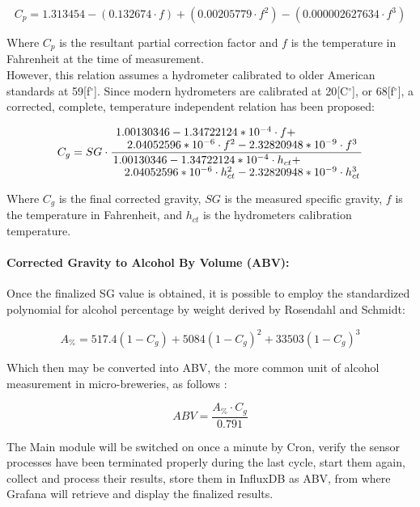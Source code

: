 \documentclass[twoside]{ctuthesis}
\theoremstyle{plain}
\theoremstyle{definition}
\theoremstyle{note}
\begin{document}
\begin{equation}
C_p = 1.313454 - (0.132674\cdot f) + (0.00205779 \cdot f^2) - (0.000002627634 \cdot f^3)
\end{equation}

Where $C_p$ is the resultant partial correction factor and $f$ is the temperature in Fahrenheit at the time of measurement.\\
However, this relation assumes a hydrometer calibrated to older American standards at 59[f$^\circ$]. Since modern hydrometers are calibrated at 20[C$^\circ$], or 68[f$^\circ$], a corrected, complete, temperature independent relation has been proposed:

\begin{equation}
C_g = SG \cdot \frac{\splitfrac{1.00130346 - 1.34722124*10^{-4} \cdot f + }{2.04052596*10^{-6} \cdot f^2 - 2.32820948*10^{-9} \cdot f^3} }{\splitfrac{1.00130346 - 1.34722124*10^{-4} \cdot h_{ct} +}{ 2.04052596*10^{-6} \cdot h_{ct}^2 - 2.32820948*10^{-9} \cdot h_{ct}^3}}
\end{equation}

Where $C_g$ is the final corrected gravity, $SG$ is the measured specific gravity, $f$ is the temperature in Fahrenheit, and $h_{ct}$ is the hydrometers calibration temperature.\\

\paragraph{Corrected Gravity to Alcohol By Volume (ABV):}
Once the finalized SG value is obtained, it is possible to employ the standardized polynomial for alcohol percentage by weight derived by Rosendahl and Schmidt\cite{Brewing_Science}:

\begin{equation}
	A_{\%} = 517.4(1-C_g) + 5084(1-C_g)^2 + 33503(1-C_g)^3
\end{equation} 

Which then may be converted into ABV, the more common unit of alcohol measurement in micro-breweries, as follows \cite{Brewing_Science}:

\begin{equation}
	ABV = \frac{A_{\%} \cdot C_g}{0.791}
\end{equation}

The Main module will be switched on once a minute by Cron, verify the sensor processes have been terminated properly during the last cycle, start them again, collect and process their results, store them in InfluxDB as ABV, from where Grafana will retrieve and display the finalized results.
\end{document}
